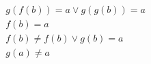 \begin{align*}
%
& g(f(b)) = a \lor g(g(b)) = a
~\\~
& f(b) = a
~\\~
& f(b)  \neq  f(b) \lor g(b) = a
~\\~
& g(a)  \neq  a
%
\end{align*}
